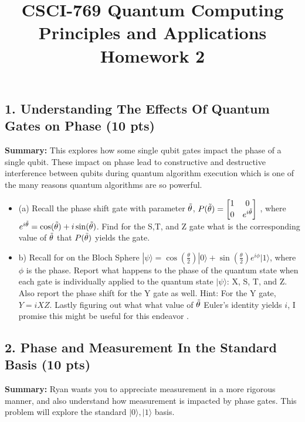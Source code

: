 \documentclass[12pt]{article}
\newcommand{\ket}[1]{| #1 \rangle}
\begin{document}
\title{CSCI-769 Quantum Computing Principles and Applications Homework 2}
\author{}
\date{}
\maketitle

\subsection*{1. Understanding The Effects Of Quantum Gates on Phase (10 pts)}

\textbf{Summary:} This explores how some single qubit gates impact the phase of a single qubit. These impact on phase lead to constructive and destructive interference between qubits during quantum algorithm execution which is one of the many reasons quantum algorithms are so powerful.
\begin{itemize}
    \item (a) Recall the phase shift gate  with parameter $\Tilde{\theta }$, $ P(\Tilde{\theta}) = \begin{bmatrix} 
1 & 0 \\ 
0 & e^{i\Tilde{\theta}} 
\end{bmatrix}$ , where $e^{i \Tilde{\theta}} = \cos(\Tilde{\theta}) +i\sin(\Tilde{\theta}) $. Find for the S,T, and Z gate what is the corresponding value of $\Tilde{\theta} $ that $P(\Tilde{\theta})$ yields the gate. 
\item b) Recall for on the Bloch Sphere $\ket{\psi} = \cos(\frac{\theta}{2}) \ket{0} +\sin(\frac{\theta}{2}) e^{i\phi} \ket{1} $, where $\phi$ is the phase. Report what happens to the phase of the quantum state when each gate is individually applied to the quantum state $\ket{\psi}$: X, S, T, and Z. Also report the phase shift for the Y gate as well. Hint: For the Y gate, $Y=iXZ$. Lastly figuring out what what value of $\Tilde{\theta}$ Euler's identity yields $i$, I promise this might be useful for this endeavor \smiley{}.
\end{itemize}






\subsection*{2. Phase and Measurement In the Standard Basis (10 pts)}

\textbf{Summary:} Ryan wants you to appreciate measurement in a more rigorous manner, and also understand how measurement is impacted by phase gates. This problem will explore the standard $\ket{0}, \ket{1} $ basis. 
\end{document}
